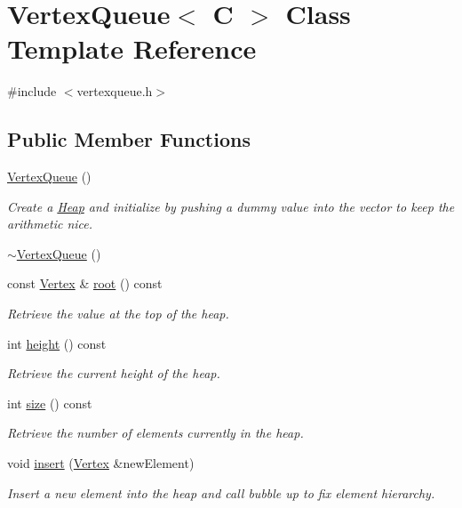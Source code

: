 \hypertarget{class_vertex_queue}{}\section{Vertex\+Queue$<$ C $>$ Class Template Reference}
\label{class_vertex_queue}


{\ttfamily \#include $<$vertexqueue.\+h$>$}

\subsection*{Public Member Functions}
\begin{DoxyCompactItemize}
\item 
\hyperlink{class_vertex_queue_ab03e81928b00e89e7cf9ba52f8e8aeb8}{Vertex\+Queue} ()
\begin{DoxyCompactList}\small\item\em Create a \hyperlink{class_heap}{Heap} and initialize by pushing a dummy value into the vector to keep the arithmetic nice. \end{DoxyCompactList}\item 
\hyperlink{class_vertex_queue_ab3f3fdeb3ec1e7d886ccf79241847e00}{$\sim$\+Vertex\+Queue} ()
\item 
const \hyperlink{class_vertex}{Vertex} \& \hyperlink{class_vertex_queue_ac8399e232e95e15fcbdb655cdb133596}{root} () const 
\begin{DoxyCompactList}\small\item\em Retrieve the value at the top of the heap. \end{DoxyCompactList}\item 
int \hyperlink{class_vertex_queue_a45a39b64c9a83f682d4d4b7b7ba8fde4}{height} () const 
\begin{DoxyCompactList}\small\item\em Retrieve the current height of the heap. \end{DoxyCompactList}\item 
int \hyperlink{class_vertex_queue_ad1129053462fffbc663036ab9c7d5449}{size} () const 
\begin{DoxyCompactList}\small\item\em Retrieve the number of elements currently in the heap. \end{DoxyCompactList}\item 
void \hyperlink{class_vertex_queue_a64453633711d2704e4c56e19a21bf0f4}{insert} (\hyperlink{class_vertex}{Vertex} \&new\+Element)
\begin{DoxyCompactList}\small\item\em Insert a new element into the heap and call bubble up to fix element hierarchy. \end{DoxyCompactList}\item 

\end{DoxyCompactItemize}
